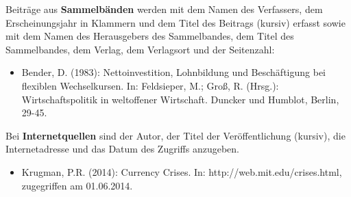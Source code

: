 \documentclass[12pt, oneside]{article}
\begin{document}
\bigskip
Beiträge aus \textbf{Sammelbänden} werden mit dem Namen des Verfassers, dem Erscheinungsjahr in Klammern und dem Titel des Beitrags (kursiv) erfasst sowie mit dem Namen des Herausgebers des Sammelbandes, dem Titel des Sammelbandes, dem Verlag, dem Verlagsort und der Seitenzahl:
\begin{itemize}
    \item Bender, D. (1983): Nettoinvestition, Lohnbildung und Beschäftigung bei flexiblen Wechselkursen. In: Feldsieper, M.; Groß, R. (Hrsg.): Wirtschaftspolitik in weltoffener Wirtschaft. Duncker und Humblot, Berlin, 29-45. 
\end{itemize}
\bigskip
\newpage
\noindent
Bei \textbf{Internetquellen} sind der Autor, der Titel der Veröffentlichung (kursiv), die Internetadresse und das Datum des Zugriffs anzugeben.
\begin{itemize}
    \item Krugman, P.R. (2014): Currency Crises. In: http://web.mit.edu/crises.html, zugegriffen am 01.06.2014.
\end{itemize}

\newpage



\printbibliography[title= Literaturverzeichnis]

\newpage
\end{document}
